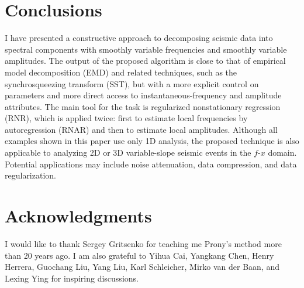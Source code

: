 \section{Conclusions}

I have presented a constructive approach to decomposing seismic data
into spectral components with smoothly variable frequencies and
smoothly variable amplitudes. The output of the proposed algorithm is
close to that of empirical model decomposition (EMD) and related
techniques, such as the synchrosqueezing transform (SST), but with a
more explicit control on parameters and more direct access to
instantaneous-frequency and amplitude attributes. The main tool for
the task is regularized nonstationary regression (RNR), which is
applied twice: first to estimate local frequencies by autoregression
(RNAR) and then to estimate local amplitudes. Although all examples
shown in this paper use only 1D analysis, the proposed technique is
also applicable to analyzing 2D or 3D variable-slope seismic events in
the $f$-$x$ domain. Potential applications may include noise
attenuation, data compression, and data regularization.

\section{Acknowledgments}

I would like to thank Sergey Gritsenko for teaching me Prony's method
more than 20 years ago. I am also grateful to Yihua Cai, Yangkang
Chen, Henry Herrera, Guochang Liu, Yang Liu, Karl Schleicher, Mirko
van der Baan, and Lexing Ying for inspiring discussions.




